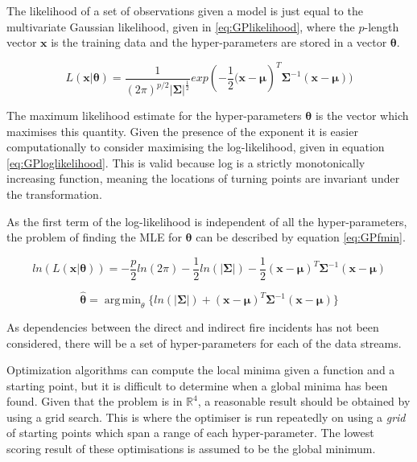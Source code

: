 \documentclass[a4paper,11pt]{report}
\DeclareMathOperator*{\argmin}{arg\,min}
\begin{document}
The likelihood of a set of observations given a model is just equal to the multivariate Gaussian likelihood, given in \ref{eq:GPlikelihood}, where the \(p\)-length vector \(\mathbf{x}\) is the training data and the hyper-parameters are stored in a vector \(\mathbf{\theta}\).

\begin{equation} \label{eq:GPlikelihood}
L(\mathbf{x | \theta}) = \frac{1}{(2\pi)^{p/2} |\boldsymbol{\Sigma|}^{\frac{1}{2}}} exp(- \frac{1}{2} \mathbf{(x}-\boldsymbol{\mu})^{T}\boldsymbol{\Sigma}^{-1}(\mathbf{x}-\boldsymbol{\mu}))
\end{equation}

The maximum likelihood estimate for the hyper-parameters \(\mathbf{\theta}\) is the vector which maximises this quantity. Given the presence of the exponent it is easier computationally to consider maximising the log-likelihood, given in equation \ref{eq:GPloglikelihood}. This is valid because log is a strictly monotonically increasing function, meaning the locations of turning points are invariant under the transformation. \par
As the first term of the log-likelihood is independent of all the hyper-parameters, the problem of finding the MLE for \(\boldsymbol{\theta}\) can be described by equation \ref{eq:GPfmin}.

\singlespacing

\begin{equation} \label{eq:GPloglikelihood}
ln(L(\mathbf{x} | \boldsymbol{\theta})) = - \frac{p}{2} ln(2\pi) - \frac{1}{2} ln(|\boldsymbol{\Sigma}|) - \frac{1}{2} (\mathbf{x}-\boldsymbol{\mu})^{T} \boldsymbol{\Sigma}^{-1}(\mathbf{x}-\boldsymbol{\mu})
\end{equation}

\begin{equation} \label{eq:GPfmin}
\hat{\boldsymbol{\theta}} = \argmin_\theta{\{ln(|\boldsymbol{\Sigma}|) +(\mathbf{x}-\boldsymbol{\mu})^{T}\boldsymbol{\Sigma}^{-1}(\mathbf{x}-\boldsymbol{\mu})}\}
\end{equation}

\doublespacing

As dependencies between the direct and indirect fire incidents has not been considered, there will be a set of hyper-parameters for each of the data streams. \par

Optimization algorithms can compute the local minima given a function and a starting point, but it is difficult to determine when a global minima has been found. Given that the problem is in \(\mathds{R}^4\), a reasonable result should be obtained by using a grid search. This is where the optimiser is run repeatedly on using a \textit{grid} of starting points which span a range of each hyper-parameter. The lowest scoring result of these optimisations is assumed to be the global minimum. \par
\end{document}

